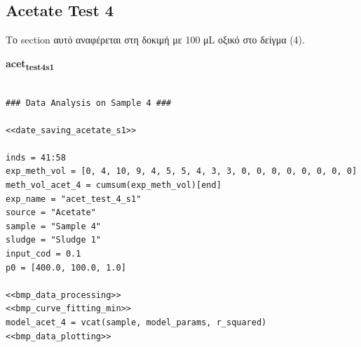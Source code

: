 \documentclass[11pt]{article}
\begin{document}
\subsection{Acetate Test 4}
\label{sec:org5c5c831}
Το section αυτό αναφέρεται στη δοκιμή με 100 μL οξικό στο δείγμα (4).

\textbf{acet\textsubscript{test}\textsubscript{4}\textsubscript{s1}}
\begin{verbatim}

### Data Analysis on Sample 4 ###

<<date_saving_acetate_s1>>

inds = 41:58
exp_meth_vol = [0, 4, 10, 9, 4, 5, 5, 4, 3, 3, 0, 0, 0, 0, 0, 0, 0, 0]
meth_vol_acet_4 = cumsum(exp_meth_vol)[end]
exp_name = "acet_test_4_s1"
source = "Acetate"
sample = "Sample 4"
sludge = "Sludge 1"
input_cod = 0.1
p0 = [400.0, 100.0, 1.0]

<<bmp_data_processing>>
<<bmp_curve_fitting_min>>
model_acet_4 = vcat(sample, model_params, r_squared)
<<bmp_data_plotting>>
\end{verbatim}
\end{document}
